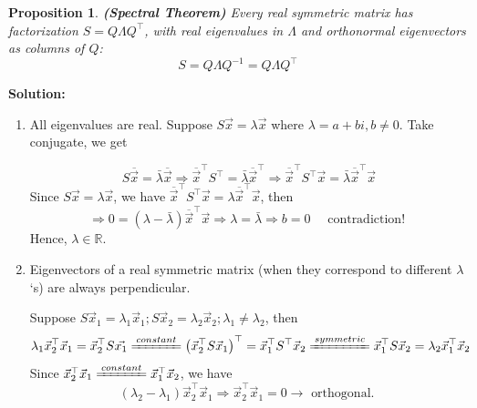 \documentclass[14pt]{article}
\newtheorem{proposition}[theorem]{Proposition}
\theoremstyle{definition}
\newenvironment{solution}
{\color{C2}\begin{framed}\begingroup\textbf{Solution:} }
  {\endgroup\end{framed}}
\theoremstyle{remark}
\begin{document}
\begin{proposition}
    \textbf{(Spectral Theorem)}
    Every real symmetric matrix has factorization $S = Q\Lambda Q^\top$, with real eigenvalues in $\Lambda$ and orthonormal eigenvectors as columns of $Q$:
    \[
        S = Q\Lambda Q^{-1} = Q\Lambda Q^\top
    \]
\end{proposition}

\begin{solution}
    \begin{enumerate}
        \item All eigenvalues are real.
              Suppose $S \vec{x}=\lambda \vec{x}$ where $\lambda=a+b i, b \neq 0$.
              Take
              conjugate, we get

              \[
                  S \overline{\vec{x}}=\bar{\lambda} \overline{\vec{x}}
                  \Rightarrow \overline{\vec{x}}^{\top} S^{\top}=\bar{\lambda} \overline{\vec{x}}^{\top}
                  \Rightarrow \overline{\vec{x}}^{\top} S^{\top} \vec{x}=\bar{\lambda} \overline{\vec{x}}^{\top} \vec{x}
              \]
              Since $S \vec{x}=\lambda \vec{x}$, we have $\overline{\vec{x}}^{\top} S^{\top} \vec{x}=\lambda \overline{\vec{x}}^{\top} \vec{x}$, then
              \[
                  \Rightarrow 0=(\lambda-\bar{\lambda})\overline{\vec{x}}^{\top} \vec{x}
                  \Rightarrow \lambda=\bar{\lambda}
                  \Rightarrow b=0 \quad \text { contradiction! }
              \]
              Hence, $\lambda \in \mathbb{R}$.
        \item Eigenvectors of a real symmetric matrix (when they correspond to different $\lambda$ `s) are always perpendicular.

              Suppose $S \vec{x}_1=\lambda_1 \vec{x}_1 ; S \vec{x}_2=\lambda_2 \vec{x}_2 ; \lambda_1 \neq \lambda_2$, then
              \[
                  \lambda_1 \vec{x}_2^{\top} \vec{x}_1 =\vec{x}_2^{\top} S \vec{x_1}
                  \xlongequal{constant} \left(\vec{x}_2^{\top} S \vec{x}_1\right)^{\top}=\vec{x}_1^{\top} S^{\top} \vec{x}_2
                  \xlongequal{symmetric}\vec{x}_1^{\top} S \vec{x}_2=\lambda_2 \vec{x}_1^{\top} \vec{x}_2
              \]
              Since $\vec{x}_2^{\top} \vec{x}_1 \xlongequal{constant} \vec{x}_1^{\top} \vec{x}_2$, we have
              \[
                  (\lambda_2-\lambda_1) \vec{x}_2^{\top} \vec{x}_1
                  \Rightarrow \vec{x}_2^{\top} \vec{x}_1=0
                  \rightarrow \text { orthogonal. }
              \]
    \end{enumerate}

\end{solution}
\end{document}
